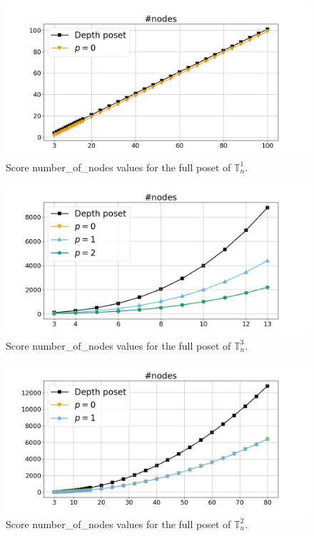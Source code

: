 \documentclass{article}
\begin{document}
    \begin{figure}[h!]
        \centering
        \hspace*{-0.24\textwidth}
        \includegraphics[width=1.4\textwidth]{pics/extended torus scores/score=number-of-nodes, dim=1, object=full.png}
        \caption{Score number\_of\_nodes values for the full poset of $\mathbb{T}_n^{1}$.}
        \label{fig:numberofnodes-full1}
    \end{figure}
    \begin{figure}[h!]
        \centering
        \hspace*{-0.24\textwidth}
        \includegraphics[width=1.4\textwidth]{pics/extended torus scores/score=number-of-nodes, dim=3, object=full.png}
        \caption{Score number\_of\_nodes values for the full poset of $\mathbb{T}_n^{3}$.}
        \label{fig:numberofnodes-full3}
    \end{figure}
    \begin{figure}[h!]
        \centering
        \hspace*{-0.24\textwidth}
        \includegraphics[width=1.4\textwidth]{pics/extended torus scores/score=number-of-nodes, dim=2, object=full.png}
        \caption{Score number\_of\_nodes values for the full poset of $\mathbb{T}_n^{2}$.}
        \label{fig:numberofnodes-full2}
    \end{figure}
\end{document}
